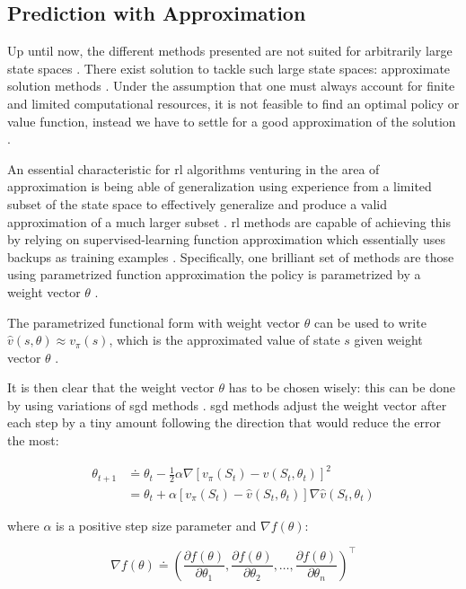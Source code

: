 \documentclass{seal_thesis}
\begin{document}
\subsection{ Prediction with Approximation}
\label{subsec:onpol_pred}

Up until now, the different methods presented are not suited for arbitrarily large state spaces \cite{Sutton2017}. There exist solution to tackle such large state spaces: approximate solution methods \cite{Sutton2017}. Under the assumption that one must always account for finite and limited computational resources, it is not feasible to find an optimal policy or value function, instead we have to settle for a good approximation of the solution \cite[p. 189]{Sutton2017}.

An essential characteristic for \gls{rl} algorithms venturing in the area of approximation is being able of generalization \ie using experience from a limited subset of the state space to effectively generalize and produce a valid approximation of a much larger subset  \cite[p. 189]{Sutton2017}. \gls{rl} methods are capable of achieving this by relying on supervised-learning function approximation which essentially uses backups as training examples \cite[p. 222]{Sutton2017}. Specifically, one brilliant set of methods are those using parametrized function approximation \ie the policy is parametrized by a weight vector $\theta$ \cite{Sutton2017}.

The parametrized functional form with weight vector $\theta$ can be used to write $\hat{v}(s,\theta) \approx v_\pi (s)$, which is the approximated value of state $s$ given weight vector $\theta$ \cite[p. 191]{Sutton2017}.

It is then clear that the weight vector $\theta$ has to be chosen wisely: this can be done by using variations of \gls{sgd} methods \cite[p. 223]{Sutton2017}. \gls{sgd} methods adjust the weight vector after each step by a tiny amount following the direction that would reduce the error the most:

\begin{align}
	\theta_{t+1} &\doteq \theta_t - \frac{1}{2} \alpha \nabla [v_\pi (S_t) - \hat{v} (S_t,\theta_t)]^2\\
	&= \theta_t + \alpha  [v_\pi (S_t) - \hat{v} (S_t,\theta_t)] \nabla \hat{v} (S_t,\theta_t)
\end{align}

where $\alpha$ is a positive step size parameter and $\nabla f(\theta)$:

\begin{equation}
	\nabla f(\theta) \doteq \left( \frac{\partial f(\theta)}{\partial \theta_1}, \frac{\partial f(\theta)}{\partial \theta_2}, \ldots, \frac{\partial f(\theta)}{\partial \theta_n} \right)^\top
\end{equation}
\end{document}
